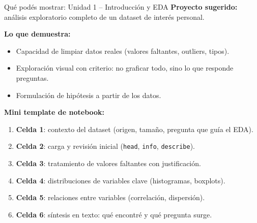 \documentclass[aspectratio=169]{beamer}
\begin{document}
\begin{frame}{Qué podés mostrar: Unidad 1 -- Introducción y EDA}
  \textbf{Proyecto sugerido:} análisis exploratorio completo de un dataset de interés personal.

  \bigskip
  \textbf{Lo que demuestra:}
  \begin{itemize}
    \item Capacidad de limpiar datos reales (valores faltantes, outliers, tipos).
    \item Exploración visual con criterio: no graficar todo, sino lo que responde preguntas.
    \item Formulación de hipótesis a partir de los datos.
  \end{itemize}

  \bigskip
  \textbf{Mini template de notebook:}
  \begin{enumerate}
    \item \textbf{Celda 1}: contexto del dataset (origen, tamaño, pregunta que guía el EDA).
    \item \textbf{Celda 2}: carga y revisión inicial (\texttt{head}, \texttt{info}, \texttt{describe}).
    \item \textbf{Celda 3}: tratamiento de valores faltantes con justificación.
    \item \textbf{Celda 4}: distribuciones de variables clave (histogramas, boxplots).
    \item \textbf{Celda 5}: relaciones entre variables (correlación, dispersión).
    \item \textbf{Celda 6}: síntesis en texto: qué encontré y qué pregunta surge.
  \end{enumerate}
\end{frame}
\end{document}
